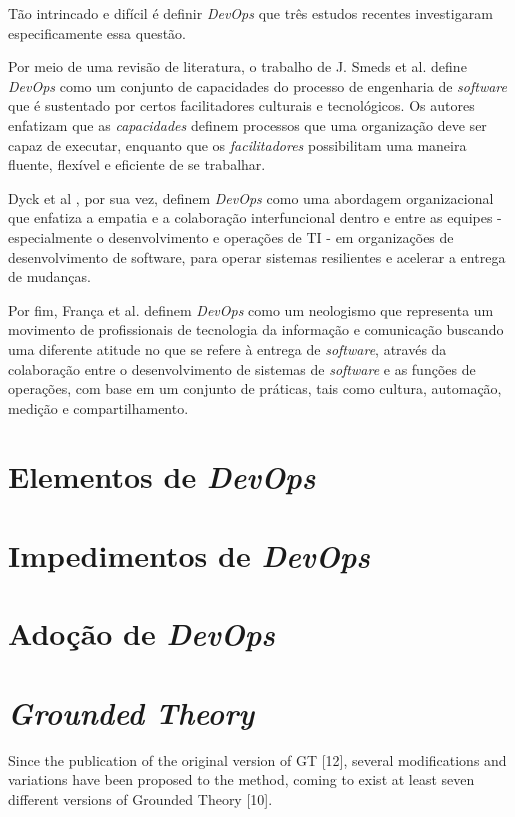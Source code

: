 Tão intrincado e difícil é definir \textit{DevOps} que três estudos recentes
investigaram especificamente essa questão.

Por meio de uma revisão de literatura, o trabalho de J. Smeds et al.
\cite{devops_a_definition} define \textit{DevOps} como um conjunto de
capacidades do processo de engenharia de \textit{software} que é sustentado
por certos facilitadores culturais e tecnológicos. Os autores enfatizam
que as \emph{capacidades} definem processos que uma organização deve ser capaz
de executar, enquanto que os \emph{facilitadores} possibilitam uma maneira
fluente, flexível e eficiente de se trabalhar.

Dyck et al \cite{towards_definitions}, por sua vez, definem \textit{DevOps}
como uma abordagem organizacional que enfatiza a empatia e a colaboração
interfuncional dentro e entre as equipes - especialmente o desenvolvimento e
operações de TI - em organizações de desenvolvimento de software, para operar
sistemas resilientes e acelerar a entrega de mudanças.

Por fim, França et al. \cite{characterizing_devops} definem \textit{DevOps}
como um neologismo que representa um movimento de profissionais de tecnologia
da informação e comunicação buscando uma diferente atitude no que se refere à
entrega de \textit{software}, através da colaboração entre o desenvolvimento de
sistemas de \textit{software} e as funções de operações, com base em um conjunto
de práticas, tais como cultura, automação, medição e compartilhamento.

\section{Elementos de \textit{DevOps}}

\section{Impedimentos de \textit{DevOps}}

\section{Adoção de \textit{DevOps}}

\section{\textit{Grounded Theory}}
Since the publication of the original version of GT [12], several
modifications and variations have been proposed to the method,
coming to exist at least seven different versions of Grounded Theory [10].



